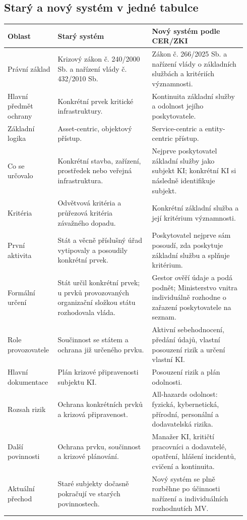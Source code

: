\subsection*{Starý a nový systém v jedné tabulce}
\begin{longtable}{p{0.18\linewidth}p{0.38\linewidth}p{0.38\linewidth}}
\toprule
\textbf{Oblast} & \textbf{Starý systém} & \textbf{Nový systém podle CER/ZKI}\\
\midrule
Právní základ & Krizový zákon č. 240/2000 Sb. a nařízení vlády č. 432/2010 Sb. & Zákon č. 266/2025 Sb. a nařízení vlády o základních službách a kritériích významnosti.\\
Hlavní předmět ochrany & Konkrétní prvek kritické infrastruktury. & Kontinuita základní služby a odolnost jejího poskytovatele.\\
Základní logika & Asset-centric, objektový přístup. & Service-centric a entity-centric přístup.\\
Co se určovalo & Konkrétní stavba, zařízení, prostředek nebo veřejná infrastruktura. & Nejprve poskytovatel základní služby jako subjekt KI; konkrétní KI si následně identifikuje subjekt.\\
Kritéria & Odvětvová kritéria a průřezová kritéria závažného dopadu. & Konkrétní základní služba a její kritérium významnosti.\\
První aktivita & Stát a věcně příslušný úřad vytipovaly a posoudily konkrétní prvek. & Poskytovatel nejprve sám posoudí, zda poskytuje základní službu a splňuje kritérium.\\
Formální určení & Stát určil konkrétní prvek; u prvků provozovaných organizační složkou státu rozhodovala vláda. & Gestor ověří údaje a podá podnět; Ministerstvo vnitra individuálně rozhodne o zařazení poskytovatele na seznam.\\
Role provozovatele & Součinnost se státem a ochrana již určeného prvku. & Aktivní sebehodnocení, předání údajů, vlastní posouzení rizik a určení vlastní KI.\\
Hlavní dokumentace & Plán krizové připravenosti subjektu KI. & Posouzení rizik a plán odolnosti.\\
Rozsah rizik & Ochrana konkrétních prvků a krizová připravenost. & All-hazards odolnost: fyzická, kybernetická, přírodní, personální a dodavatelská rizika.\\
Další povinnosti & Ochrana prvku, součinnost a krizové plánování. & Manažer KI, kritičtí pracovníci a dodavatelé, opatření, hlášení incidentů, cvičení a kontinuita.\\
Aktuální přechod & Staré subjekty dočasně pokračují ve starých povinnostech. & Nový systém se plně rozběhne po účinnosti nařízení a individuálních rozhodnutích MV.\\
\bottomrule
\end{longtable}

